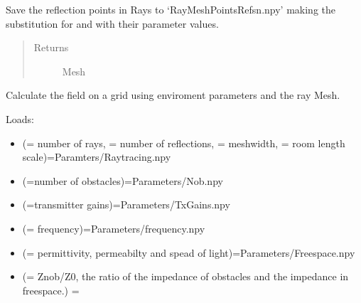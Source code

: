 \documentclass[letterpaper,10pt,english]{sphinxmanual}
\begin{document}
\begin{fulllineitems}
Save the reflection points in Rays to   ‘RayMeshPointsRefsn.npy’ making the   substitution for  and  with their parameter values.
\begin{quote}\begin{description}
\item[{Returns}] \leavevmode
Mesh

\end{description}\end{quote}

\end{fulllineitems}


\begin{fulllineitems}
\label{\detokenize{index:RayTracerMainProgram.Quality}}
Calculate the field on a grid using enviroment parameters and the   ray Mesh.

Loads:
\begin{itemize}
\item {} 
(= number of rays, = number of reflections,   = meshwidth, = room length scale)=\textasciigrave{}Paramters/Raytracing.npy\textasciigrave{}

\item {} 
(=number of obstacles)=\textasciigrave{}Parameters/Nob.npy\textasciigrave{}

\item {} 
(=transmitter gains)=\textasciigrave{}Parameters/TxGains.npy\textasciigrave{}

\item {} 
(= frequency)=\textasciigrave{}Parameters/frequency.npy\textasciigrave{}

\item {} 
(= permittivity, permeabilty   and spead of light)=\textasciigrave{}Parameters/Freespace.npy\textasciigrave{}

\item {} 
(= Znob/Z0, the ratio of the impedance of obstacles and   the impedance in freespace.) = 


\end{itemize}
\end{fulllineitems}
\end{document}
